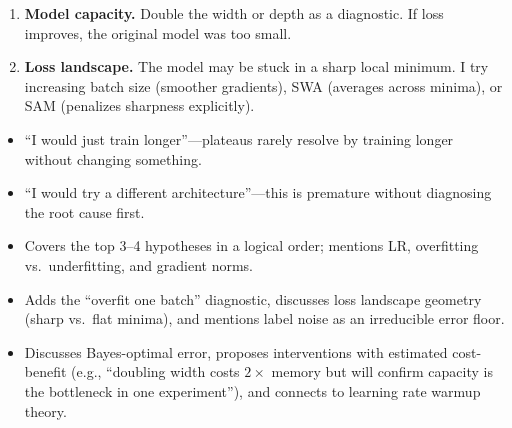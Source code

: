 \begin{interviewq}
\begin{enumerate}
    \item \textbf{Model capacity.} Double the width or depth as a diagnostic. If loss improves, the original model was too small.

    \item \textbf{Loss landscape.} The model may be stuck in a sharp local minimum. I try increasing batch size (smoother gradients), SWA (averages across minima), or SAM (penalizes sharpness explicitly).
\end{enumerate}

\redflags
\begin{itemize}
    \item ``I would just train longer''---plateaus rarely resolve by training longer without changing something.
    \item ``I would try a different architecture''---this is premature without diagnosing the root cause first.
\end{itemize}


\goodgreat
\begin{itemize}
    \item {} Covers the top 3--4 hypotheses in a logical order; mentions LR, overfitting vs.\ underfitting, and gradient norms.
    \item {} Adds the ``overfit one batch'' diagnostic, discusses loss landscape geometry (sharp vs.\ flat minima), and mentions label noise as an irreducible error floor.
    \item {} Discusses Bayes-optimal error, proposes interventions with estimated cost-benefit (e.g., ``doubling width costs $2\times$ memory but will confirm capacity is the bottleneck in one experiment''), and connects to learning rate warmup theory.
\end{itemize}

\end{interviewq}

